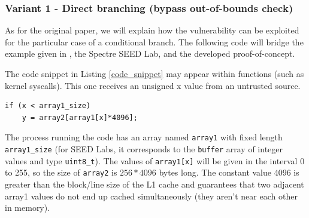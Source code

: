 \documentclass[conference]{IEEEtran}
\begin{document}
\subsubsection{Variant 1 - Direct branching (bypass out-of-bounds check)}
As for the original paper, we will explain how the vulnerability can be exploited for the particular case of a conditional branch. The following code will bridge the example given in \cite{spectrePaper}, the Spectre SEED Lab, and the developed proof-of-concept.

The code snippet in Listing \ref{code_snippet} may appear within functions (such as kernel syscalls). This one receives an unsigned x value from an untrusted source.
\begin{lstlisting}[style=CStyle, caption=Conditional branching, label=code_snippet]
if (x < array1_size)
    y = array2[array1[x]*4096];
\end{lstlisting}
The process running the code has an array named \texttt{array1} with fixed length \texttt{array1\_size} (for SEED Labs, it corresponds to the \texttt{buffer} array of integer values and type \texttt{uint8\_t}). The values of \texttt{array1[x]} will be given in the interval 0 to 255, so the size of \texttt{array2} is $256*4096$ bytes long. The constant value 4096 is greater than the block/line size of the L1 cache and guarantees that two adjacent array1 values do not end up cached simultaneously (they aren't near each other in memory).
\end{document}
